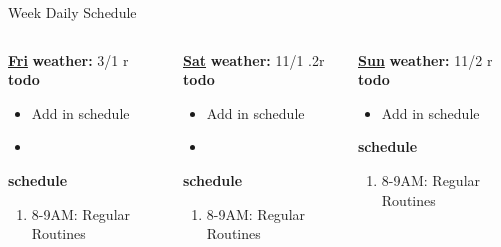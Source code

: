 \begin{columns}
\begin{column}{0.5\linewidth}
{\begin{block}{Week Daily Schedule}
\begin{columns}
          \begin{column}{0.14\textwidth}{\small \underline{\bf Fri}}
            {\small \bf weather: } 3/1 r \\ 
            {\small {\bf todo}} \\ 
            \begin{itemize}
              \tiny \item \tiny Add in schedule
            \item \tiny 
            \end{itemize} 
                {\small {\bf schedule}} \\
                \begin{enumerate} 
                  \tiny \item \tiny 8-9AM: Regular Routines 
                \end{enumerate}
          \end{column}

          \begin{column}{0.15\textwidth}{\small \underline{\bf Sat}}
            {\small \bf weather: } 11/1 .2r \\ 
            { \small {\bf todo}} \\ 
            \begin{itemize}
              \tiny \item \tiny Add in schedule
            \item \tiny 
            \end{itemize} 
                {\small {\bf schedule}} \\
                \begin{enumerate} 
                  \tiny \item \tiny 8-9AM: Regular Routines 
                \end{enumerate}
          \end{column}
          
          \begin{column}{0.15\textwidth}{\small \underline{\bf Sun}}
            {\small \bf weather: } 11/2 r \\ 
            {\small {\bf todo}}\\ 
            \begin{itemize}
              \tiny \item \tiny Add in schedule
            \end{itemize} 
                {\small {\bf schedule}}\\
                \begin{enumerate} 
                  \tiny \item \tiny 8-9AM: Regular Routines 
                \end{enumerate}
          \end{column}


\end{columns}
\end{block}}
\end{column}
\end{columns}
